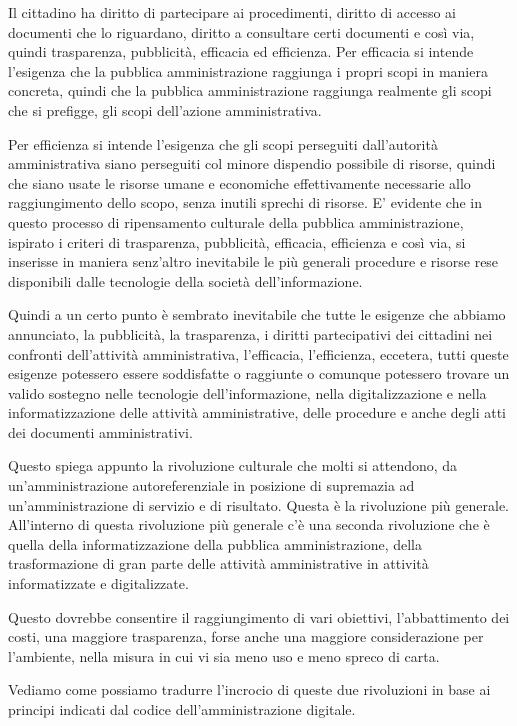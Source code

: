 Il cittadino ha diritto di partecipare ai procedimenti, diritto di accesso ai documenti che lo riguardano, diritto a consultare certi documenti e così via, quindi trasparenza, pubblicità, efficacia ed efficienza.
Per efficacia si intende l'esigenza che la pubblica amministrazione raggiunga i propri scopi in maniera concreta, quindi che la pubblica amministrazione raggiunga realmente gli scopi che si prefigge, gli scopi dell'azione amministrativa.

Per efficienza si intende l'esigenza che gli scopi perseguiti dall'autorità amministrativa siano perseguiti col minore dispendio possibile di risorse, quindi che siano usate le risorse umane e economiche effettivamente necessarie allo raggiungimento dello scopo, senza inutili sprechi di risorse.
E' evidente che in questo processo di ripensamento culturale della pubblica amministrazione, ispirato i criteri di trasparenza, pubblicità, efficacia, efficienza e così via, si inserisse in maniera senz'altro inevitabile le più generali procedure e risorse rese disponibili dalle tecnologie della società dell'informazione. 

Quindi a un certo punto è sembrato inevitabile che tutte le esigenze che abbiamo annunciato, la pubblicità, la trasparenza, i diritti partecipativi dei cittadini nei confronti dell'attività amministrativa, l'efficacia, l'efficienza, eccetera, tutti queste esigenze potessero essere soddisfatte o raggiunte o comunque potessero trovare un valido sostegno nelle tecnologie dell'informazione, nella digitalizzazione e nella informatizzazione delle attività amministrative, delle procedure e anche degli atti dei documenti amministrativi.

Questo spiega appunto la rivoluzione culturale che molti si attendono, da un'amministrazione autoreferenziale in posizione di supremazia ad un'amministrazione di servizio e di risultato.
Questa è la rivoluzione più generale. All'interno di questa rivoluzione più generale c'è una seconda rivoluzione che è quella della informatizzazione della pubblica amministrazione, della trasformazione di gran parte delle attività amministrative in attività informatizzate e digitalizzate. 

Questo dovrebbe consentire il raggiungimento di vari obiettivi, l'abbattimento dei costi, una maggiore trasparenza, forse anche una maggiore considerazione per l'ambiente, nella misura in cui vi sia meno uso e meno spreco di carta. 

Vediamo come possiamo tradurre l'incrocio di queste due rivoluzioni in base ai principi indicati dal codice dell'amministrazione digitale.

